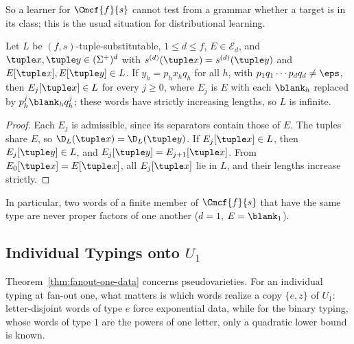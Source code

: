 So a learner for $\Cmcf{f}{s}$ cannot test from a grammar whether a target is
in its class; this is the usual situation for distributional learning.


\begin{lemma}
\label{lem:no-insertion}
Let $L$ be $(f,s)$-tuple-substitutable, $1\le d\le f$, $E\in\mathcal E_d$, and
$\tuple x,\tuple y\in(\Sigma^+)^d$ with $s^{(d)}(\tuple x)=s^{(d)}(\tuple y)$ and
$E[\tuple x],E[\tuple y]\in L$.  If $y_h=p_hx_hq_h$ for all $h$, with
$p_1q_1\cdots p_dq_d\ne\eps$, then $E_j[\tuple x]\in L$ for every $j\ge0$, where $E_j$
is $E$ with each $\blank_h$ replaced by $p_h^j\blank_hq_h^j$; these words have
strictly increasing lengths, so $L$ is infinite.
\end{lemma}

\begin{proof}
Each $E_j$ is admissible, since its separators contain those of
$E$.  The tuples share $E$, so $\D_L(\tuple x)=\D_L(\tuple y)$.  If
$E_j[\tuple x]\in L$, then $E_j[\tuple y]\in L$, and $E_j[\tuple y]=E_{j+1}[\tuple x]$.
From $E_0[\tuple x]=E[\tuple x]$, all $E_j[\tuple x]$ lie in $L$, and their lengths
increase strictly.
\end{proof}

In particular, two words of a finite member of $\Cmcf{f}{s}$ that have the same
type are never proper factors of one another ($d=1$, $E=\blank_1$).


\subsection{Individual Typings onto \texorpdfstring{$U_1$}{U1}}
\label{subsec:u1-typings}

Theorem~\ref{thm:fanout-one-data} concerns pseudovarieties.  For an
individual typing at fan-out one, what matters is which words realize a copy
$\{e,z\}$ of $U_1$: letter-disjoint words of type $e$ force exponential data,
while for the binary typing, whose words of type $1$ are the powers of one
letter, only a quadratic lower bound is known.

